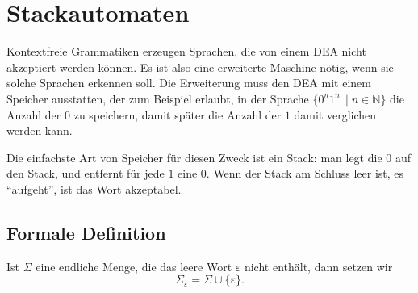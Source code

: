 %
%
%
\section{Stackautomaten}
%
Kontextfreie Grammatiken erzeugen Sprachen, die von einem DEA nicht
akzeptiert werden können. Es ist also eine erweiterte Maschine
nötig, wenn sie solche Sprachen erkennen soll. Die Erweiterung muss
den DEA mit einem Speicher ausstatten, der zum Beispiel erlaubt, 
in der Sprache $\{0^n1^n\,\;|\; n\in\mathbb N\}$ die Anzahl der
$0$ zu speichern, damit später die Anzahl der $1$
damit verglichen werden kann.

Die einfachste Art von Speicher für diesen Zweck ist ein Stack:
man legt die $0$ auf den Stack, und entfernt für jede $1$ eine 
$0$. Wenn der Stack am Schluss leer ist, es ``aufgeht'', ist das
Wort akzeptabel.

\subsection{Formale Definition}
\begin{definition}
Ist $\Sigma$ eine endliche Menge, die das leere Wort $\varepsilon$
nicht enthält, dann setzen wir 
\[
\Sigma_\varepsilon = \Sigma\cup \{\varepsilon\}.
\]
\end{definition}


